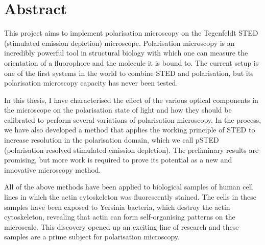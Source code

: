 \chapter{Abstract}

This project aims to implement polarisation microscopy on the Tegenfeldt STED (stimulated emission depletion) microscope. Polarisation microscopy is an incredibly powerful tool in structural biology with which one can measure the orientation of a fluorophore and the molecule it is bound to. The current setup is one of the first systems in the world to combine STED and polarisation, but its polarisation microscopy capacity has never been tested.

In this thesis, I have characterised the effect of the various optical components in the microscope on the polarisation state of light and how they should be calibrated to perform several variations of polarisation microscopy. In the process, we have also developed a method that applies the working principle of STED to increase resolution in the polarisation domain, which we call pSTED (polarisation-resolved stimulated emission depletion). The preliminary results are promising, but more work is required to prove its potential as a new and innovative microscopy method.

All of the above methods have been applied to biological samples of human cell lines in which the actin cytoskeleton was fluorescently stained. The cells in these samples have been exposed to Yersinia bacteria, which destroy the actin cytoskeleton, revealing that actin can form self-organising patterns on the microscale. This discovery opened up an exciting line of research and these samples are a prime subject for polarisation microscopy.